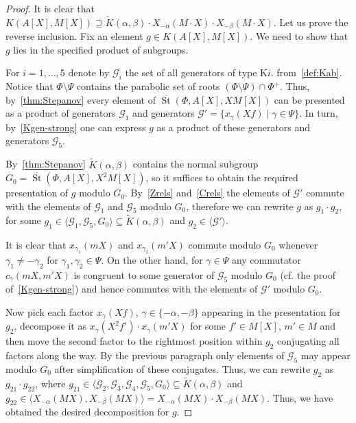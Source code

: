 \documentclass[oneside, 8pt]{amsart}
\theoremstyle{remark}
\theoremstyle{definition}
\numberwithin{lemma}{section}
\numberwithin{prop}{section}
\numberwithin{corollary}{section}
\numberwithin{externaltheorem}{section}
\DeclareMathOperator{\St}{St}
\numberwithin{equation}{section}
\begin{document}
\begin{proof}
It is clear that $K(A[X], M[X]) \supseteq \widetilde{K}(\alpha, \beta) \cdot X_{-\alpha}(M \cdot X) \cdot X_{-\beta}(M \cdot X)$. Let us prove the reverse inclusion. Fix an element $g\in K(A[X], M[X])$. We need to show that $g$ lies in the specified product of subgroups.

For $i=1,\ldots,5$ denote by $\mathcal{G}_i$ the set of all generators of type K$i$. from~\cref{def:Kab}.
Notice that $\Phi \setminus \Psi$ contains the parabolic set of roots $(\Phi \setminus \Psi)\cap \Phi^+$.
Thus, by~\cref{thm:Stepanov} every element of $\overline{\St}(\Phi, A[X], XM[X])$ can be presented as a product of generators $\mathcal{G}_1$ and generators $\mathcal{G}' = \{ x_{\gamma}(Xf) \mid \gamma \in \Psi\}$. In turn, by~\cref{Kgen-strong} one can express $g$ as a product of these generators and generators $\mathcal{G}_5$. 

By~\cref{thm:Stepanov} $\widetilde{K}(\alpha, \beta)$ contains the normal subgroup $G_0 = \overline{\St}(\Phi, A[X], X^2M[X])$, so it suffices to obtain the required presentation of $g$ modulo $G_0$. By~\cref{Zrels} and~\cref{Crels} the elements of $\mathcal{G}'$ commute with the elements of $\mathcal{G}_1$ and $\mathcal{G}_5$ modulo $G_0$, therefore we can rewrite $g$ as $g_1 \cdot g_2$, for some $g_1 \in \langle \mathcal{G}_1, \mathcal{G}_5, G_0 \rangle \subseteq \widetilde{K}(\alpha, \beta)$ and $g_2 \in \langle \mathcal{G}' \rangle$.

It is clear that  $x_{\gamma_1}(mX)$ and $x_{\gamma_2}(m'X)$ commute modulo $G_0$ whenever $\gamma_1 \neq - \gamma_2$ for $\gamma_1, \gamma_2 \in \Psi$. On the other hand, for $\gamma \in \Psi$ any commutator $c_{\gamma}(mX, m'X)$ is congruent to some generator of $\mathcal{G}_5$  modulo $G_0$ (cf. the proof of~\cref{Kgen-strong}) and hence commutes with the elements of $\mathcal{G}'$ modulo $G_0$. 

Now pick each factor $x_{\gamma}(Xf)$, $\gamma \in \{ -\alpha, -\beta \}$ appearing in the presentation for $g_2$, decompose it as $x_{\gamma}(X^2f') \cdot x_{\gamma}(m'X)$ for some $f' \in M[X]$, $m' \in M$ and then move the second factor to the rightmost position within $g_2$ conjugating all factors along the way. By the previous paragraph only elements of  $\mathcal{G}_5$ may appear modulo $G_0$ after simplification of these conjugates.
Thus, we can rewrite $g_2$ as $g_{21} \cdot g_{22}$, where $g_{21} \in \langle \mathcal{G}_2, \mathcal{G}_3, \mathcal{G}_4, \mathcal{G}_5, G_0 \rangle \subseteq \widetilde{K}(\alpha, \beta)$ and $g_{22} \in \langle X_{-\alpha}(MX), X_{-\beta}(MX) \rangle = X_{-\alpha}(MX) \cdot X_{-\beta}(MX)$.
Thus, we have obtained the desired decomposition for $g$. \end{proof}
\end{document}

